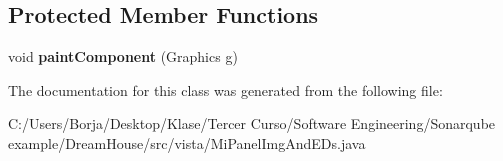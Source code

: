 \subsection*{Protected Member Functions}
\begin{DoxyCompactItemize}
\item 
\mbox{\label{classvista_1_1_mi_panel_img_and_e_ds_abb385fe3b946590d52a1a7373e1fdda5}} 
void {\bfseries paint\+Component} (Graphics g)
\end{DoxyCompactItemize}


The documentation for this class was generated from the following file\+:\begin{DoxyCompactItemize}
\item 
C\+:/\+Users/\+Borja/\+Desktop/\+Klase/\+Tercer Curso/\+Software Engineering/\+Sonarqube example/\+Dream\+House/src/vista/Mi\+Panel\+Img\+And\+E\+Ds.\+java\end{DoxyCompactItemize}
